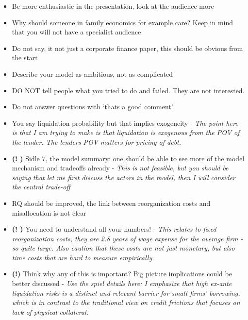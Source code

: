 \documentclass[12pt]{article}
\begin{document}
\begin{itemize}
    \noindent \textbf{Notes after the presentation - General talking points}
    \item  Be more enthusiastic in the presentation, look at the audience more
    \item  Why should someone in family economics for example care? Keep in mind that you will not have a specialist audience
    \item  Do not say, it not just a corporate finance paper, this should be obvious from the start
    \item  Describe your model as ambitious, not as complicated
    \item  DO NOT tell people what you tried to do and failed. They are not interested. 
    \item  Do not answer questions with `thats a good comment'.
    \item  You say liquidation probability but that implies exogeneity - \textit{The point here is that I am trying to make is that liquidation is exogenous from the POV of the lender. The lenders POV matters for pricing of debt.}
    \item \textbf{(! \checkmark)} Sidle 7, the model summary: one should be able to see more of the model mechanism and tradeoffs already - \textit{This is not feasible, but you should be saying that let me first discuss the actors in the model, then I will consider the central trade-off}
    \item  RQ should be improved, the link between reorganization costs and misallocation is not clear
    \item \textbf{(! \checkmark)} You need to understand all your numbers! - \textit{This relates to fixed reorganization costs, they are 2.8 years of wage expense for the average firm - so quite large. Also caution that these costs are not just monetary, but also time costs that are hard to measure empirically.}
    \item \textbf{(!)}  Think why any of this is important? Big picture implications could be better discussed - \textit{Use the spiel details here: I emphasize that high ex-ante liquidation risks is a distinct and relevant barrier for small firms' borrowing, which is in contrast to the traditional view on credit frictions that focuses on lack of physical collateral.}
    
    \bigskip


\end{itemize}
\end{document}
